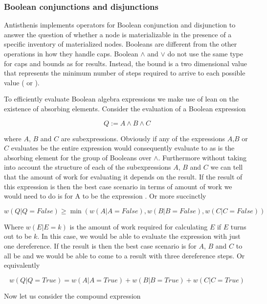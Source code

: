\subsubsection{Boolean conjunctions and disjunctions}

Antisthenis implements operators for Boolean conjunction and
disjunction to answer the question of whether a node is materializable
in the presence of a specific inventory of materialized
nodes. Booleans are different from the other operations in how they
handle caps. Boolean \(\land\) and \(\lor\) do not use the same type
for caps and bounds as for results. Instead, the bound is a two
dimensional value that represents the minimum number of steps required
to arrive to each possible value ( or ).

To efficiently evaluate Boolean algebra expressions we make use of
lean on the existence of absorbing elements. Consider the evaluation of a Boolean expression

\[
Q := A \land B \land C
\]

where \(A\), \(B\) and \(C\) are subexpressions. Obviously if any of
the expressions \(A\),\(B\) or \(C\) evaluates be  the
entire expression would consequently evaluate to  as
 is the absorbing element for the group of Booleans over
\(\land\). Furthermore without taking into account the structure of
each of the subexpressions \(A\), \(B\) and \(C\) we can tell that the
amount of work for evaluating it depends on the result. If the result
of this expression is  then the best case scenario in
terms of amount of work we would need to do is for A to be the
expression . Or more succinctly

\[
w(Q|Q=\mathit{False}) \ge \min (w(A | A = \mathit{False}), w(B | B = \mathit{False}), w(C | C = \mathit{False}))
\]

Where \(w(E|E=k)\) is the amount of work required for calculating \(E\) if
\(E\) turns out to be \(k\). In this case, we would be able to evaluate
the expression with just one dereference. If the result is 
then the best case scenario is for \(A\), \(B\) and \(C\) to all be
 and we would be able to come to a result with three
dereference steps. Or equivalently

\[
w(Q|Q=\mathit{True}) = w(A | A = \mathit{True}) + w(B | B = \mathit{True}) + w(C | C = \mathit{True})
\]

Now let us consider the compound expression

